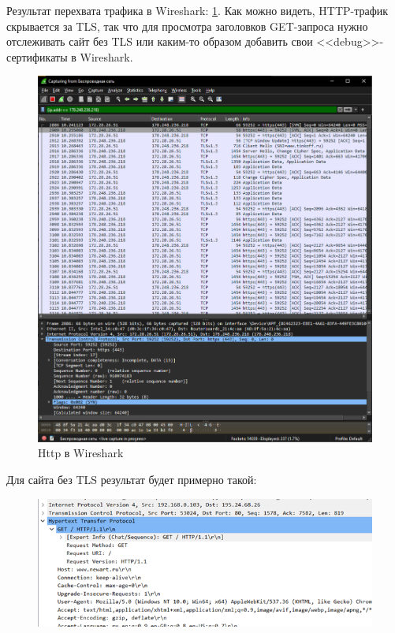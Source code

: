 
Результат перехвата трафика в Wireshark: \ref{fig:http-wireshark}. Как можно видеть, HTTP-трафик скрывается за TLS, так что для просмотра заголовков GET-запроса нужно отслеживать сайт без TLS или каким-то образом добавить свои <<debug>>-сертификаты в Wireshark.

\begin{figure}[h]
    \centering
    \includegraphics[width=1\linewidth]{res/http-wireshark.png}
    \caption{Http в Wireshark}
    \label{fig:http-wireshark}
\end{figure}

Для сайта без TLS результат будет примерно такой:

\begin{figure}[H]
    \centering
    \includegraphics[width=1\linewidth]{res/http-no-tls.png}
\end{figure}

